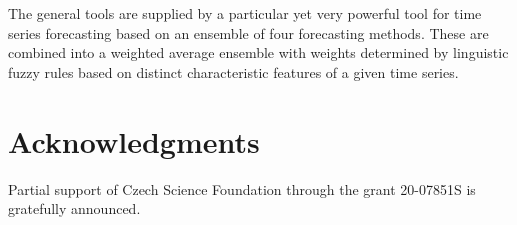 \documentclass[review]{elsarticle}
\begin{document}
 The general tools are supplied by a particular yet very powerful tool for time series forecasting based on an ensemble of four forecasting methods. These are combined into a weighted average ensemble  with weights determined by linguistic fuzzy rules based on distinct characteristic features of a given time series. 


 
 

\section*{Acknowledgments}

Partial support of Czech Science Foundation through the grant 20-07851S is gratefully announced.




\end{document}
